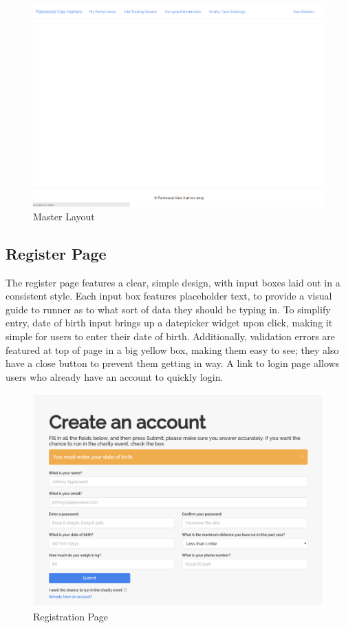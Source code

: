 \documentclass{article}[12pt,a4paper]
\begin{document}
\begin{figure}[h!]
  \includegraphics[scale=0.25]{final_ui/layout}
  \caption{Master Layout}
\end{figure}

\clearpage

\subsection{Register Page}
The register page features a clear, simple design, with input boxes laid out in a consistent style. Each input box features placeholder text, to provide a visual guide to runner as to what sort of data they should be typing in. To simplify entry, date of birth input brings up a datepicker widget upon click, making it simple for users to enter their date of birth. Additionally, validation errors are featured at top of page in a big yellow box, making them easy to see; they also have a close button to prevent them getting in way. A link to login page allows users who already have an account to quickly login.

\begin{figure}[h!]
  \includegraphics[scale=0.35]{final_ui/register}
  \caption{Registration Page}
\end{figure}
\clearpage
\end{document}

